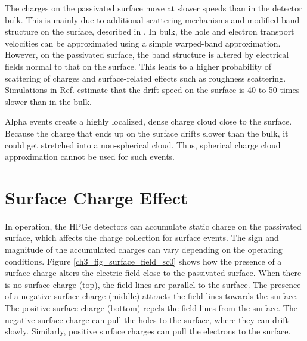 The charges on the passivated surface move at slower speeds than in the detector bulk. This is mainly due to additional scattering mechanisms and modified band structure on the surface, described in \cite{MULLOWNEY201233}. In bulk, the hole and electron transport velocities can be approximated using a simple warped-band approximation. However, on the passivated surface, the band structure is altered by electrical fields normal to that on the surface. This leads to a higher probability of scattering of charges and surface-related effects such as roughness scattering.  Simulations in Ref. \cite{MULLOWNEY201233} estimate that the drift speed on the surface is 40 to 50 times slower than in the bulk. 

Alpha events create a highly localized, dense charge cloud close to the surface. Because the charge that ends up on the surface drifts slower than the bulk, it could get stretched into a non-spherical cloud. Thus, spherical charge cloud approximation cannot be used for such events.



\section{Surface Charge Effect}
In operation, the HPGe detectors can accumulate static charge on the passivated surface, which affects the charge collection for surface events. The sign and magnitude of the accumulated charges can vary depending on the operating conditions. Figure \ref{ch3_fig_surface_field_sc0} shows how the presence of a surface charge alters the electric field close to the passivated surface. When there is no surface charge (top), the field lines are parallel to the surface. The presence of a negative surface charge (middle) attracts the field lines towards the surface. The positive surface charge (bottom) repels the field lines from the surface. The negative surface charge can pull the holes to the surface, where they can drift slowly. Similarly, positive surface charges can pull the electrons to the surface.

